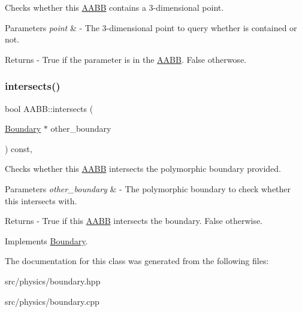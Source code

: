 Checks whether this \mbox{\hyperlink{class_a_a_b_b}{A\+A\+BB}} contains a 3-\/dimensional point. 
\begin{DoxyParams}{Parameters}
{\em point} & -\/ The 3-\/dimensional point to query whether is contained or not. \\
\hline
\end{DoxyParams}
\begin{DoxyReturn}{Returns}
-\/ True if the parameter is in the \mbox{\hyperlink{class_a_a_b_b}{A\+A\+BB}}. False otherwose. 
\end{DoxyReturn}
\mbox{\label{class_a_a_b_b_ab427a4455732a16802103e06ed4af02a}} 
\subsubsection{\texorpdfstring{intersects()}{intersects()}\hspace{0.1cm}{\footnotesize\ttfamily [3/3]}}
{\footnotesize\ttfamily bool A\+A\+B\+B\+::intersects (\begin{DoxyParamCaption}\item[{\mbox{\hyperlink{class_boundary}{Boundary}} $\ast$}]{other\+\_\+boundary }\end{DoxyParamCaption}) const\hspace{0.3cm}{\ttfamily [override]}, {\ttfamily [virtual]}}

Checks whether this \mbox{\hyperlink{class_a_a_b_b}{A\+A\+BB}} intersects the polymorphic boundary provided. 
\begin{DoxyParams}{Parameters}
{\em other\+\_\+boundary} & -\/ The polymorphic boundary to check whether this intersects with. \\
\hline
\end{DoxyParams}
\begin{DoxyReturn}{Returns}
-\/ True if this \mbox{\hyperlink{class_a_a_b_b}{A\+A\+BB}} intersects the boundary. False otherwise. 
\end{DoxyReturn}


Implements \mbox{\hyperlink{class_boundary_a364909bdfa4a4945f974c34a39e198cc}{Boundary}}.



The documentation for this class was generated from the following files\+:\begin{DoxyCompactItemize}
\item 
src/physics/boundary.\+hpp\item 
src/physics/boundary.\+cpp\end{DoxyCompactItemize}
